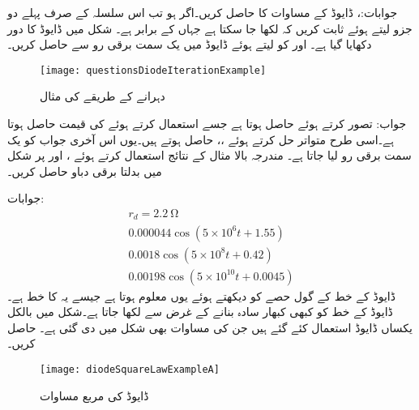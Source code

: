 جوابات:،  
ڈایوڈ کے مساوات  کا  حاصل کریں۔اگر  ہو تب اس سلسلہ کے صرف پہلے دو جزو لیتے ہوئے ثابت کریں کہ  لکھا جا سکتا ہے جہاں  کے برابر ہے۔ 
شکل  میں ڈایوڈ کا دور دکھایا گیا ہے۔ اور  کو  لیتے ہوئے ڈایوڈ میں یک سمت برقی رو  سے حاصل کریں۔
\begin{figure}
\centering
\texttt{[image: questionsDiodeIterationExample]}
\caption{دہرانے کے طریقے کی مثال}
\label{شکل_ڈایوڈ_دہرانے_کا_طریقہ}
\end{figure}

جواب: تصور کرتے ہوئے  حاصل ہوتا ہے جسے استعمال کرتے ہوئے  کی قیمت  حاصل ہوتا ہے۔اسی طرح متواتر حل کرتے ہوئے ،،  حاصل ہوتے ہیں۔یوں اس آخری جواب کو یک سمت برقی رو لیا جاتا ہے۔    
مندرجہ بالا مثال کے نتائج استعمال کرتے ہوئے ،  اور  پر شکل میں بدلتا برقی دباو  حاصل کریں۔

جوابات:
\begin{align*}
r_d=\SI{2.2}{\ohm}\\
0.000044 \cos (5 \times 10^{6} t+1.55)\\
0.0018 \cos (5 \times 10^{8} t+0.42)\\
0.00198 \cos (5 \times 10^{10} t+0.0045)
\end{align*}
ڈایوڈ کے خط کے گول حصے کو دیکھتے ہوئے یوں معلوم ہوتا ہے جیسے یہ  کا خط ہے۔ڈایوڈ کے خط کو کبھی کبھار سادہ بنانے کے غرض سے  لکھا جاتا ہے۔شکل  میں بالکل یکساں ڈایوڈ استعمال کئے گئے ہیں جن کی مساوات بھی شکل میں دی گئی ہے۔ حاصل کریں۔ 
\begin{figure}
\centering
\texttt{[image: diodeSquareLawExampleA]}
\caption{ڈایوڈ کی مربع مساوات}
\label{شکل_ڈایوڈ_مربع_مساوات}
\end{figure}

